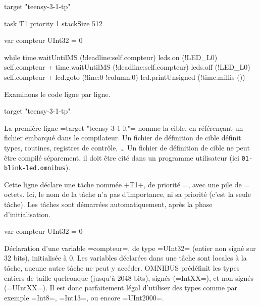 \begin{OMNIBUS}[1]
target "teensy-3-1-tp"

task T1 priority 1 stackSize 512 {
  var compteur UInt32 = 0

  while time.waitUntilMS (!deadline:self.compteur) {
    leds.on (!LED_L0)
    self.compteur +%
    time.waitUntilMS (!deadline:self.compteur)
    leds.off (!LED_L0)
    self.compteur +%
    lcd.goto (!line:0 !column:0)
    lcd.printUnsigned (!time.millis ())
  }
}

Examinons le code ligne par ligne.

\begin{OMNIBUS}[1]
target "teensy-3-1-tp"
\end{OMNIBUS}

La première ligne \omnibus=target "teensy-3-1-it"= nomme la cible, en référençant un fichier embarqué dans le compilateur. Un fichier de définition de cible définit types, routines, registres de contrôle, … Un fichier de définition de cible ne peut être compilé séparement, il doit être cité dans un programme utilisateur (ici \texttt{01-blink-led.omnibus}).

\begin{OMNIBUS}[3]
task T1 priority 1 stackSize 512 {
\end{OMNIBUS}

Cette ligne déclare une tâche nommée \omnibus+T1+, de priorité =, avec une pile de = octets. Ici, le nom de la tâche n'a pas d'importance, ni sa priorité (c'est la seule tâche). Les tâches sont démarrées automatiquement, après la phase d'initialisation.

\begin{OMNIBUS}[4]
  var compteur UInt32 = 0
\end{OMNIBUS}

Déclaration d'une variable \omnibus=compteur=, de type \omnibus=UInt32= (entier non signé sur 32 bits), initialisée à 0. Les variables déclarées dans une tâche sont locales à la tâche, aucune autre tâche ne peut y accéder. OMNIBUS prédéfinit les types entiers de taille quelconque (jusqu'à 2048 bits), signés (\omnibus=IntXX=), et non signés (\omnibus=UIntXX=). Il est donc parfaitement légal d'utiliser des types comme par exemple \omnibus=Int8=, \omnibus=Int13=, ou encore \omnibus=UInt2000=.


\begin{OMNIBUS}[6]
  while time.waitUntilMS (!deadline:self.compteur) {
\end{OMNIBUS}


\end{OMNIBUS}
